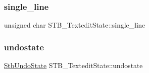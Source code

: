\subsubsection{\texorpdfstring{single\+\_\+line}{single\_line}}
{\footnotesize\ttfamily unsigned char S\+T\+B\+\_\+\+Textedit\+State\+::single\+\_\+line}

\hypertarget{struct_s_t_b___textedit_state_a7e1f0366bbd57e01a4f49a720beb9ead}{}\label{struct_s_t_b___textedit_state_a7e1f0366bbd57e01a4f49a720beb9ead} 
\subsubsection{\texorpdfstring{undostate}{undostate}}
{\footnotesize\ttfamily \hyperlink{struct_stb_undo_state}{Stb\+Undo\+State} S\+T\+B\+\_\+\+Textedit\+State\+::undostate}

